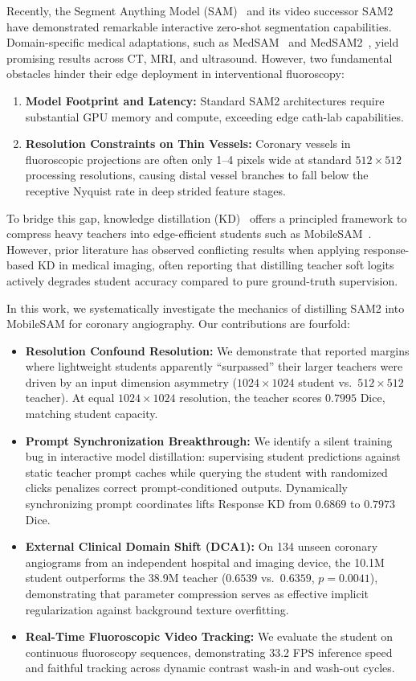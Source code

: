 \documentclass[10pt,twocolumn]{article}
\begin{document}
Recently, the Segment Anything Model (SAM)~\citep{sam} and its video successor SAM2~\citep{sam2} have demonstrated remarkable interactive zero-shot segmentation capabilities. Domain-specific medical adaptations, such as MedSAM~\citep{medsam} and MedSAM2~\citep{medsam2}, yield promising results across CT, MRI, and ultrasound. However, two fundamental obstacles hinder their edge deployment in interventional fluoroscopy:
\begin{enumerate}
    \item \textbf{Model Footprint and Latency:} Standard SAM2 architectures require substantial GPU memory and compute, exceeding edge cath-lab capabilities.
    \item \textbf{Resolution Constraints on Thin Vessels:} Coronary vessels in fluoroscopic projections are often only 1--4 pixels wide at standard $512\times 512$ processing resolutions, causing distal vessel branches to fall below the receptive Nyquist rate in deep strided feature stages.
\end{enumerate}

To bridge this gap, knowledge distillation (KD)~\citep{hinton2015distilling} offers a principled framework to compress heavy teachers into edge-efficient students such as MobileSAM~\citep{zhang2023mobilesam}. However, prior literature has observed conflicting results when applying response-based KD in medical imaging, often reporting that distilling teacher soft logits actively degrades student accuracy compared to pure ground-truth supervision.

In this work, we systematically investigate the mechanics of distilling SAM2 into MobileSAM for coronary angiography. Our contributions are fourfold:
\begin{itemize}
    \item \textbf{Resolution Confound Resolution:} We demonstrate that reported margins where lightweight students apparently ``surpassed'' their larger teachers were driven by an input dimension asymmetry ($1024\times 1024$ student vs.\ $512\times 512$ teacher). At equal $1024\times 1024$ resolution, the teacher scores $0.7995$ Dice, matching student capacity.
    \item \textbf{Prompt Synchronization Breakthrough:} We identify a silent training bug in interactive model distillation: supervising student predictions against static teacher prompt caches while querying the student with randomized clicks penalizes correct prompt-conditioned outputs. Dynamically synchronizing prompt coordinates lifts Response KD from $0.6869$ to $0.7973$ Dice.
    \item \textbf{External Clinical Domain Shift (DCA1):} On 134 unseen coronary angiograms from an independent hospital and imaging device, the 10.1M student outperforms the 38.9M teacher ($0.6539$ vs.\ $0.6359$, $p=0.0041$), demonstrating that parameter compression serves as effective implicit regularization against background texture overfitting.
    \item \textbf{Real-Time Fluoroscopic Video Tracking:} We evaluate the student on continuous fluoroscopy sequences, demonstrating 33.2 FPS inference speed and faithful tracking across dynamic contrast wash-in and wash-out cycles.
\end{itemize}
\end{document}
